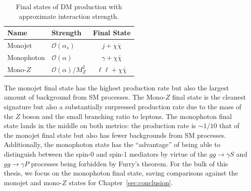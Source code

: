 \begin{table}[htbp]
\centering
\caption{
  Final states of DM production with approximate interaction strength.
}
\label{tab:monox}
\begin{tabular}{ l|l|c }
  Name & Strength & Final State \\
  \hline
  Monojet & $\mathcal{O}(\alpha_s)$ & $j+\chi\bar\chi$ \\
  Monophoton & $\mathcal{O}(\alpha)$ & $\gamma+\chi\bar\chi$ \\
  Mono-$Z$ & $\mathcal{O}(\alpha)/M_Z^2$ & $\ell\ell+\chi\bar\chi$ \\
\end{tabular}
\end{table}

The monojet final state has the highest production rate but also the largest amount of background from SM processes.
The Mono-$Z$ final state is the cleanest signature but also a substantially surpressed production rate due to the mass of the $Z$ boson and the small branching ratio to leptons.
The monophoton final state lands in the middle on both metrics: the production rate is $\sim 1/10$ that of the monojet final state but also has fewer backgrounds from SM processes.
Additionally, the monophoton state has the ``advantage'' of being able to distinguish between the spin-0 and spin-1 mediators by virtue of the $gg \rightarrow \gamma S$ and $gg \rightarrow \gamma P$ processes being forbidden by Furry's theorem.
For the bulk of this thesis, we focus on the monophoton final state, saving comparisons against the monojet and mono-$Z$ states for Chapter~\ref{sec:conclusion}. 
